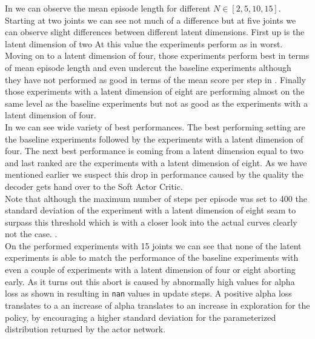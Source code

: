 In  we can observe the mean episode length for different $N \in [2, 5, 10, 15]$. Starting at two joints we can see not much of a difference but at five joints we can observe slight differences between different latent dimensions. First up is the latent dimension of two At this value the experiments perform as in  worst.\\
Moving on to a latent dimension of four, those experiments perform best in terms of mean episode length and even undercut the baseline experiments although they have not performed as good in terms of the mean score per step in . Finally those experiments with a latent dimension of eight are performing almost on the same level as the baseline experiments but not as good as the experiments with a latent dimension of four. \\
In  we can see wide variety of best performances. The best performing setting are the baseline experiments followed by the experiments with a latent dimension of four. The next best performance is coming from a latent dimension equal to two and last ranked are the experiments with a latent dimension of eight. As we have mentioned earlier we suspect this drop in performance caused by the quality the decoder gets hand over to the Soft Actor Critic. \\
Note that although the maximum number of steps per episode was set to 400 the standard deviation of the experiment with a latent dimension of eight seam to surpass this threshold which is with a closer look into the actual curves clearly not the case. . \\ 
On the performed experiments with 15 joints we can see that none of the latent experiments is able to match the performance of the baseline experiments with even a couple of experiments with a latent dimension of four or eight aborting early. As it turns out this abort is caused by abnormally high values for alpha loss as shown in  resulting in \texttt{nan} values in update steps. A positive alpha loss translates to a an increase of alpha translates to an increase in exploration for the policy, by encouraging a higher standard deviation for the parameterized distribution returned by the actor network.
